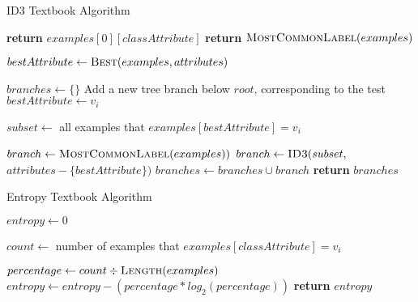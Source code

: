\begin{algorithm}[H]
\caption{ID3 Textbook Algorithm}\label{a:id3-simple}
\begin{algorithmic}[1]
        \State \textbf{return} $examples[0][classAttribute]$
        \State \textbf{return} $\textsc{MostCommonLabel}(examples)$
    \EndIf

    \State $bestAttribute \gets \textsc{Best}(examples, attributes)$
    
    \State $branches \gets \{\}$
        \State Add a new tree branch below $root$, corresponding to the test $bestAttribute \gets v_i$

        \State $subset \gets$ all examples that $examples[bestAttribute] = v_i$
        
            \State $branch \gets \textsc{MostCommonLabel}(examples))$
        \Else
            \State $branch \gets \textsc{ID3}(subset,$ $attributes - \{bestAttribute\})$
        \EndIf
        \State $branches \gets branches \cup branch$
    \EndFor
    \State \textbf{return} $branches$
\EndProcedure
\end{algorithmic}
\end{algorithm}


\begin{algorithm}[H]
\caption{Entropy Textbook Algorithm}\label{a:id3-Entropy-simple}
\begin{algorithmic}[1]
    \State $entropy \gets 0$
    
        \State $count \gets$ number of examples that $examples[classAttribute] = v_i$
        
        \State $percentage \gets count \div \textsc{Length}(examples)$
            \State $entropy \gets entropy - (percentage * log_2 (percentage))$
        \EndIf
    \EndFor
    \State \textbf{return} $entropy$
\EndProcedure
\end{algorithmic}
\end{algorithm}


